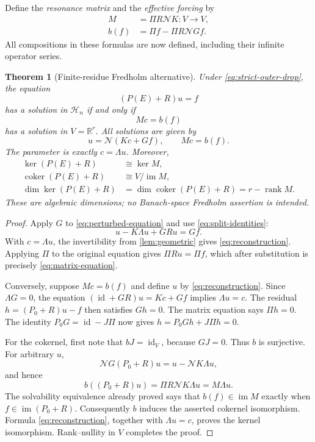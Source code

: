 \documentclass[11pt,a4paper]{article}
\numberwithin{equation}{section}
\newtheorem{theorem}{Theorem}[section]
\theoremstyle{definition}
\theoremstyle{remark}
\newcommand{\R}{\mathbb R}
\newcommand{\HH}{\mathcal H}
\newcommand{\im}{\operatorname{im}}
\newcommand{\coker}{\operatorname{coker}}
\newcommand{\rank}{\operatorname{rank}}
\newcommand{\id}{\operatorname{id}}
\newcommand{\shift}{\mathcal N}
\begin{document}
Define the \emph{resonance matrix} and the \emph{effective forcing} by
\begin{align}
 M&=\Pi R\shift K:V\longrightarrow V,\\
 b(f)&=\Pi f-\Pi R\shift Gf.
 \label{eq:effective-data}
\end{align}
All compositions in these formulas are now defined, including their infinite operator series.

\begin{theorem}[Finite-residue Fredholm alternative]
\label{thm:fredholm}
Under \eqref{eq:strict-outer-drop}, the equation
\begin{equation}
 (P(E)+R)u=f
 \label{eq:perturbed-equation}
\end{equation}
has a solution in $\HH_n$ if and only if
\begin{equation}
 Mc=b(f)
 \label{eq:matrix-equation}
\end{equation}
has a solution in $V=\R^r$. All solutions are given by
\begin{equation}
 u=\shift(Kc+Gf),\qquad Mc=b(f).
 \label{eq:reconstruction}
\end{equation}
The parameter is exactly $c=\Lambda u$. Moreover,
\begin{align}
 \ker(P(E)+R)&\cong\ker M,\\
 \coker(P(E)+R)&\cong V/\im M,\\
 \dim\ker(P(E)+R)&=\dim\coker(P(E)+R)=r-\rank M.
 \label{eq:index}
\end{align}
These are algebraic dimensions; no Banach-space Fredholm assertion is intended.
\end{theorem}
\begin{proof}
Apply $G$ to \eqref{eq:perturbed-equation} and use \eqref{eq:split-identities}:
\[
 u-K\Lambda u+GRu=Gf.
\]
With $c=\Lambda u$, the invertibility from \cref{lem:geometric} gives \eqref{eq:reconstruction}. Applying $\Pi$ to the original equation gives $\Pi Ru=\Pi f$, which after substitution is precisely \eqref{eq:matrix-equation}.

Conversely, suppose $Mc=b(f)$ and define $u$ by \eqref{eq:reconstruction}. Since $\Lambda G=0$, the equation $(\id+GR)u=Kc+Gf$ implies $\Lambda u=c$. The residual
$h=(P_0+R)u-f$ then satisfies $Gh=0$. The matrix equation says $\Pi h=0$. The identity $P_0G=\id-J\Pi$ now gives $h=P_0Gh+J\Pi h=0$.

For the cokernel, first note that $bJ=\id_V$, because $GJ=0$. Thus $b$ is surjective. For arbitrary $u$,
\[
 \shift G(P_0+R)u=u-\shift K\Lambda u,
\]
and hence
\[
 b((P_0+R)u)=\Pi R\shift K\Lambda u=M\Lambda u.
\]
The solvability equivalence already proved says that $b(f)\in\im M$ exactly when $f\in\im(P_0+R)$. Consequently $b$ induces the asserted cokernel isomorphism. Formula \eqref{eq:reconstruction}, together with $\Lambda u=c$, proves the kernel isomorphism. Rank--nullity in $V$ completes the proof.
\end{proof}
\end{document}
